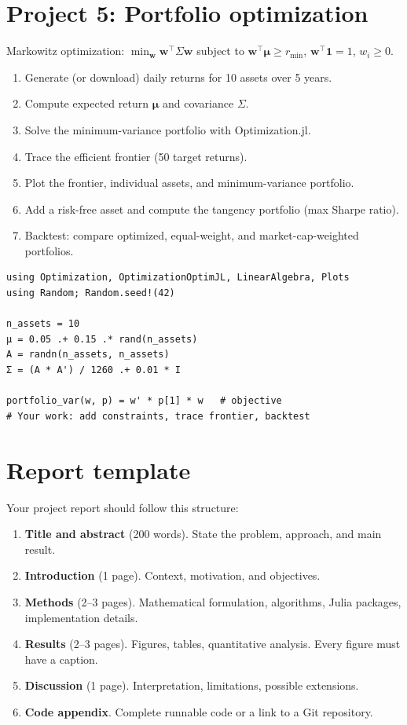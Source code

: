 \section{Project 5: Portfolio optimization}

Markowitz optimization: $\min_{\mathbf{w}} \mathbf{w}^\top\Sigma\mathbf{w}$ subject to $\mathbf{w}^\top\boldsymbol{\mu} \geq r_{\min}$, $\mathbf{w}^\top\mathbf{1}=1$, $w_i \geq 0$.

\begin{enumerate}
  \item Generate (or download) daily returns for 10 assets over 5 years.
  \item Compute expected return $\boldsymbol{\mu}$ and covariance $\Sigma$.
  \item Solve the minimum-variance portfolio with Optimization.jl.
  \item Trace the efficient frontier (50 target returns).
  \item Plot the frontier, individual assets, and minimum-variance portfolio.
  \item Add a risk-free asset and compute the tangency portfolio (max Sharpe ratio).
  \item Backtest: compare optimized, equal-weight, and market-cap-weighted portfolios.
\end{enumerate}

\begin{verbatim}
using Optimization, OptimizationOptimJL, LinearAlgebra, Plots
using Random; Random.seed!(42)

n_assets = 10
μ = 0.05 .+ 0.15 .* rand(n_assets)
A = randn(n_assets, n_assets)
Σ = (A * A') / 1260 .+ 0.01 * I

portfolio_var(w, p) = w' * p[1] * w   # objective
# Your work: add constraints, trace frontier, backtest
\end{verbatim}

\section{Report template}

Your project report should follow this structure:

\begin{enumerate}
  \item \textbf{Title and abstract} (200 words). State the problem, approach, and main result.
  \item \textbf{Introduction} (1 page). Context, motivation, and objectives.
  \item \textbf{Methods} (2--3 pages). Mathematical formulation, algorithms, Julia packages, implementation details.
  \item \textbf{Results} (2--3 pages). Figures, tables, quantitative analysis. Every figure must have a caption.
  \item \textbf{Discussion} (1 page). Interpretation, limitations, possible extensions.
  \item \textbf{Code appendix}. Complete runnable code or a link to a Git repository.
\end{enumerate}

